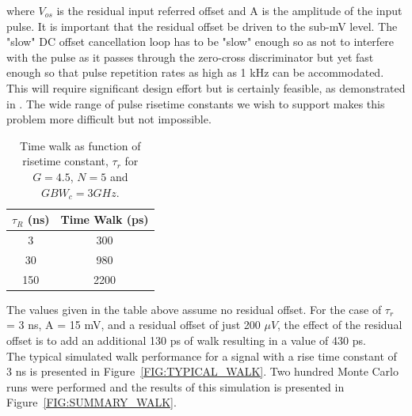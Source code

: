 \documentclass[12pt, onecolumn]{IEEEtran}
\begin{document}
where $V_{os}$ is the residual input referred offset and A is the amplitude of the input pulse. It is important that the residual offset be driven to the sub-mV level.  The "slow" DC offset cancellation loop has to be "slow" enough so as not to interfere with the pulse as it passes through the zero-cross discriminator but yet fast enough so that pulse repetition rates as high as 1 kHz can be accommodated.  This will require significant design effort but is certainly feasible, as demonstrated in \cite{507173}. The wide range of pulse risetime constants we wish to support makes this problem more difficult but not impossible.\\

\begin{table}[htbp!]
\begin{center}
\begin{tabular}{||c | c||} 
\hline
$\tau_R$ (ns) & Time Walk  (ps)\\ [0.5ex] 
\hline\hline
3 &  300 \\ 
\hline
30 & 980  \\
\hline
150 & 2200 \\ [1ex] 
\hline
\end{tabular}
\end{center}
\caption{Time walk as function of risetime constant, $\tau_r$ for $G = 4.5$, $N = 5$ and $GBW_{c} = 3 GHz$.}
\label{WalkTable}
\end{table}


The values given in the table above assume no residual offset.  For the case of $\tau_r$ = 3 ns, A = 15 mV, and a residual offset of just 200 $\mu V$, the effect of the residual offset is to add an additional 130 ps of walk resulting in a value of 430 ps.\\

The typical simulated walk performance for a signal with a rise time constant of 3 ns is presented in Figure~\ref{FIG:TYPICAL_WALK}.  Two hundred Monte Carlo runs were performed and the results of this simulation is presented in Figure~\ref{FIG:SUMMARY_WALK}.\\
\end{document}
